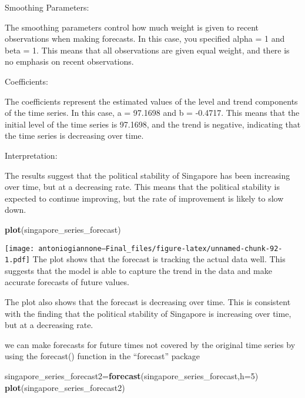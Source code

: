 \documentclass[
]{article}
\newenvironment{Shaded}{\begin{snugshade}}{\end{snugshade}}
\newcommand{\AttributeTok}[1]{\textcolor[rgb]{0.13,0.29,0.53}{#1}}
\newcommand{\DecValTok}[1]{\textcolor[rgb]{0.00,0.00,0.81}{#1}}
\newcommand{\FunctionTok}[1]{\textcolor[rgb]{0.13,0.29,0.53}{\textbf{#1}}}
\newcommand{\NormalTok}[1]{#1}
\newcommand{\OtherTok}[1]{\textcolor[rgb]{0.56,0.35,0.01}{#1}}
\begin{document}
Smoothing Parameters:

The smoothing parameters control how much weight is given to recent
observations when making forecasts. In this case, you specified alpha =
1 and beta = 1. This means that all observations are given equal weight,
and there is no emphasis on recent observations.

Coefficients:

The coefficients represent the estimated values of the level and trend
components of the time series. In this case, a = 97.1698 and b =
-0.4717. This means that the initial level of the time series is
97.1698, and the trend is negative, indicating that the time series is
decreasing over time.

Interpretation:

The results suggest that the political stability of Singapore has been
increasing over time, but at a decreasing rate. This means that the
political stability is expected to continue improving, but the rate of
improvement is likely to slow down.

\begin{Shaded}
\begin{Highlighting}[]
\FunctionTok{plot}\NormalTok{(singapore\_series\_forecast)}
\end{Highlighting}
\end{Shaded}

\texttt{[image: antoniogiannone---Final\_files/figure-latex/unnamed-chunk-92-1.pdf]}
The plot shows that the forecast is tracking the actual data well. This
suggests that the model is able to capture the trend in the data and
make accurate forecasts of future values.

The plot also shows that the forecast is decreasing over time. This is
consistent with the finding that the political stability of Singapore is
increasing over time, but at a decreasing rate.

we can make forecasts for future times not covered by the original time
series by using the forecast() function in the ``forecast'' package

\begin{Shaded}
\begin{Highlighting}[]
\NormalTok{singapore\_series\_forecast2}\OtherTok{=}\FunctionTok{forecast}\NormalTok{(singapore\_series\_forecast,}\AttributeTok{h=}\DecValTok{5}\NormalTok{)}
\FunctionTok{plot}\NormalTok{(singapore\_series\_forecast2)}
\end{Highlighting}
\end{Shaded}
\end{document}
